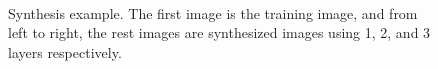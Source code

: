 \documentclass[11pt]{article}
\begin{document}
\begin{figure}[h]
	\centering
	\setlength{\fboxrule}{1pt}
	\setlength{\fboxsep}{0cm}	
	\\[3px]
	\caption{Synthesis example. The first image is the training image, and from left to right, the rest images are synthesized images using 1, 2, and 3 layers respectively.}
	\label{fig:syn}
\end{figure}
\end{document}
